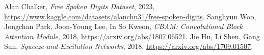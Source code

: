 \documentclass[12pt]{article}
\begin{document}

\begin{thebibliography}{9}
Alan Chalker,
\textit{Free Spoken Digits Dataset},
2023,
\url{https://www.kaggle.com/datasets/alanchn31/free-spoken-digits}.
Sanghyun Woo, Jongchan Park, Joon-Young Lee, In So Kweon,
\textit{CBAM: Convolutional Block Attention Module},
2018,
\url{https://arxiv.org/abs/1807.06521}.
Jie Hu, Li Shen, Gang Sun,
\textit{Squeeze-and-Excitation Networks},
2018,
\url{https://arxiv.org/abs/1709.01507}.
\end{thebibliography}
\end{document}
